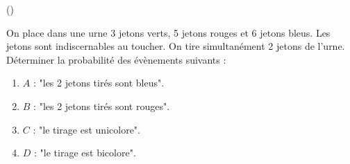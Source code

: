 \begin{exercice}\label{exo3-5} (\boringexo)

On place dans une urne 3 jetons verts, 5 jetons rouges et 6 jetons bleus. Les jetons sont indiscernables au toucher. On tire simultan\'ement 2 jetons de l'urne. D\'eterminer la probabilit\'e des \'ev\`enements suivants :

\begin{enumerate}

\item $A$ : "les 2 jetons tir\'es sont bleus".

\item $B$ : "les 2 jetons tir\'es sont rouges".

\item $C$ : "le tirage est unicolore".

\item $D$ : "le tirage est bicolore".

\end{enumerate}

\end{exercice}
